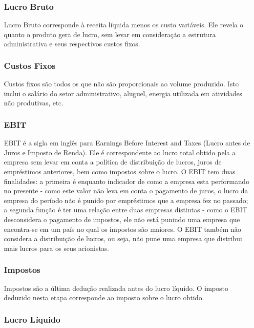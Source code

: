 \documentclass[12pt]{article}
\begin{document}
\subsubsection{Lucro Bruto}

	Lucro Bruto corresponde à receita líquida menos os custo variáveis. Ele revela o quanto o produto gera de lucro, sem levar em consideração a estrutura administrativa e seus respectivos custos fixos.

\subsubsection{Custos Fixos}

	Custos fixos são todos os que não são proporcionais ao volume produzido. Isto inclui o salário do setor administrativo, aluguel, energia utilizada em atividades não produtivas, etc.

\subsubsection{EBIT}

	EBIT é a sigla em inglês para Earnings Before Interest and Taxes (Lucro antes de Juros e Imposto de Renda). Ele é correspondente ao lucro total obtido pela a empresa sem levar em conta a política de distribuição de lucros, juros de empréstimos anteriores, bem como impostos sobre o lucro. O EBIT tem duas finalidades: a primeira é enquanto indicador de como a empresa esta performando no presente - como este valor não leva em conta o pagamento de juros, o lucro da empresa do período não é punido por empréstimos que a empresa fez no passado; a segunda função é ter uma relação entre duas empresas distintas - como o EBIT desconsidera o pagamento de impostos, ele não está punindo uma empresa que encontra-se em um país no qual os impostos são maiores. O EBIT também não considera a distribuição de lucros, ou seja, não pune uma empresa que distribui mais lucros para os seus acionistas.

\subsubsection{Impostos}

	Impostos são a última dedução realizada antes do lucro líquido. O imposto deduzido nesta etapa corresponde ao imposto sobre o lucro obtido.

\subsubsection{Lucro Líquido}
\end{document}
